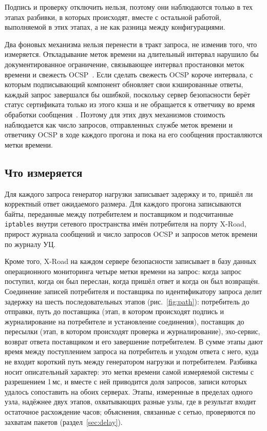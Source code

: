 \documentclass[conference,a4paper]{IEEEtran}
\newcommand{\newtext}[1]{{\color{blue}#1}}
\begin{document}
Подпись и проверку отключить нельзя, поэтому они наблюдаются только в тех этапах
разбивки, в которых происходят, вместе с остальной работой, выполняемой в этих этапах, а не как
разница между конфигурациями.

Два фоновых механизма нельзя перенести в тракт запроса, не изменив того, что
измеряется. Откладывание меток времени на длительный интервал нарушило бы документированное ограничение, связывающее
интервал простановки меток времени и свежесть OCSP~\cite{xroadsyspar}. Если сделать свежесть OCSP короче
интервала, с которым подписывающий компонент обновляет свои кэшированные ответы, каждый запрос \newtext{завершался бы} ошибкой,
поскольку сервер безопасности берёт статус сертификата только из этого кэша и не обращается к
ответчику во время обработки сообщения\newtext{~\cite{xroadsrc}}. Поэтому для этих двух механизмов стоимость наблюдается как число запросов,
отправленных службе меток времени и ответчику OCSP в ходе каждого прогона и пока на его сообщения
проставляются метки времени.

\subsection{Что измеряется}\label{sec:measured}

Для каждого запроса генератор нагрузки записывает задержку и то, пришёл ли корректный ответ
ожидаемого размера. Для каждого прогона записываются байты, переданные между потребителем и поставщиком
и подсчитанные \texttt{iptables} внутри сетевого пространства имён потребителя на порту X-Road,
прирост журнала сообщений и число запросов OCSP и запросов меток времени по журналу УЦ.

Кроме того, X-Road на каждом сервере безопасности записывает в базу данных операционного
мониторинга четыре метки времени на запрос: когда запрос поступил, когда он был переслан, когда пришёл ответ и
когда он был возвращён. Соединение записей потребителя и поставщика по идентификатору запроса
делит задержку на шесть последовательных этапов \newtext{(рис.~\ref{fig:path})}: потребитель до отправки, путь до поставщика
(этап,
в котором происходят подпись и журналирование на потребителе и установление соединения),
поставщик до пересылки (этап, в котором происходят проверка и
журналирование), эхо-сервис, возврат ответа поставщиком
и его завершение потребителем. В сумме этапы дают время между поступлением запроса на
потребитель и уходом ответа с него, куда не входит короткий путь между генератором нагрузки и
потребителем. Разбивка носит описательный характер:
это метки времени самой измеряемой системы с разрешением 1\,мс, и вместе с ней приводится доля
запросов, записи которых удалось сопоставить на обоих серверах. Этапы, измеренные в пределах
одного узла, надёжнее двух этапов, охватывающих разные узлы, где в результат входит остаточное
расхождение часов; объяснения, связанные с сетью, проверяются по захватам пакетов
(раздел~\ref{sec:delay}).
\end{document}
